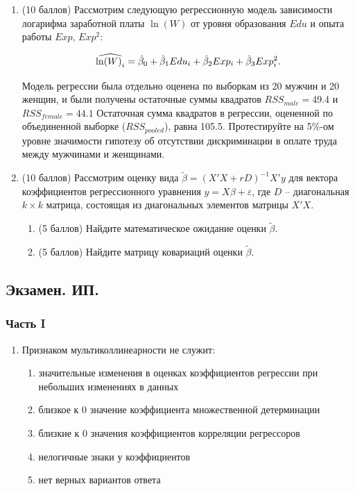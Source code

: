 \begin{enumerate}
\item (10 баллов) Рассмотрим следующую регрессионную модель зависимости логарифма заработной платы $\ln (W)$ от уровня образования $Edu$ и опыта работы $Exp$, $Exp^2$:
 
\[
\widehat{\ln (W)_i} = \hat{\beta}_0 + \hat{\beta}_1 Edu_i + \hat{\beta}_2 Exp_i + \hat{\beta}_3 Exp^2_i.
\]

Модель регрессии была отдельно оценена по выборкам из 20 мужчин и 20 женщин, и
были получены остаточные суммы квадратов $RSS_{male} = 49.4$ и $RSS_{female} = 44.1$ Остаточная сумма квадратов в регрессии, оцененной по объединенной выборке ($RSS_{pooled}$), равна 105.5. Протестируйте на 5\%-ом уровне значимости гипотезу об отсутствии дискриминации в оплате труда между мужчинами и женщинами.

\item (10 баллов) Рассмотрим оценку вида $\tilde\beta = (X'X+rD)^{-1}X'y$ для вектора коэффициентов регрессионного уравнения $y = X\beta + \varepsilon$, где $D$ – диагональная $k \times k$ матрица, состоящая из диагональных элементов матрицы $X'X$.

\begin{enumerate}
\item (5 баллов) Найдите математическое ожидание оценки $\tilde\beta$.
\item (5 баллов) Найдите матрицу ковариаций оценки $\tilde\beta$.
\end{enumerate}
\end{enumerate}

\subsection{Экзамен. ИП.}





\subsubsection*{Часть I}

\begin{enumerate}
    \item Признаком мультиколлинеарности не служит:
    \begin{enumerate}
    \item значительные изменения в оценках коэффициентов регрессии при небольших изменениях в данных
	\item близкое к 0 значение коэффициента множественной детерминации
	\item близкие к 0 значения коэффициентов корреляции регрессоров
	\item нелогичные знаки у коэффициентов
	\item нет верных вариантов ответа
    \end{enumerate}

\end{enumerate}


